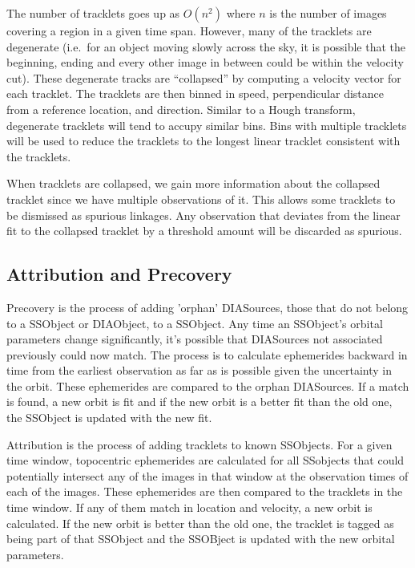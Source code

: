The number of tracklets goes up as $O(n^2)$ where $n$ is the number of images covering a region in a given time span.  However, many of the tracklets are degenerate (i.e.\ for an object moving slowly across the sky, it is possible that the beginning, ending and every other image in between could be within the velocity cut). These degenerate tracks are ``collapsed'' by computing a velocity vector for each tracklet.  The tracklets are then binned in speed, perpendicular distance from a reference location, and direction.  Similar to a Hough transform, degenerate tracklets will tend to accupy similar bins.  Bins with multiple tracklets will be used to reduce the tracklets to the longest linear tracklet consistent with the tracklets.

When tracklets are collapsed, we gain more information about the collapsed tracklet since we have multiple observations of it.  This allows some tracklets to be dismissed as spurious linkages.  Any observation that deviates from the linear fit to the collapsed tracklet by a threshold amount will be discarded as spurious.

\subsection{Attribution and Precovery}
\label{sec:acAttributionAndPrecovery}
Precovery is the process of adding 'orphan' DIASources, those that do not belong to a SSObject or DIAObject, to a SSObject.  Any time an SSObject's orbital parameters change significantly, it's possible that DIASources not associated previously could now match.  The process is to calculate ephemerides backward in time from the earliest observation as far as is possible given the uncertainty in the orbit.  These ephemerides are compared to the orphan DIASources.  If a match is found, a new orbit is fit and if the new orbit is a better fit than the old one, the SSObject is updated with the new fit.

Attribution is the process of adding tracklets to known SSObjects.  For a given time window, topocentric ephemerides are calculated for all SSobjects that could potentially intersect any of the images in that window at the observation times of each of the images.  These ephemerides are then compared to the tracklets in the time window.  If any of them match in location and velocity, a new orbit is calculated.  If the new orbit is better than the old one, the tracklet is tagged as being part of that SSObject and the SSOBject is updated with the new orbital parameters.


